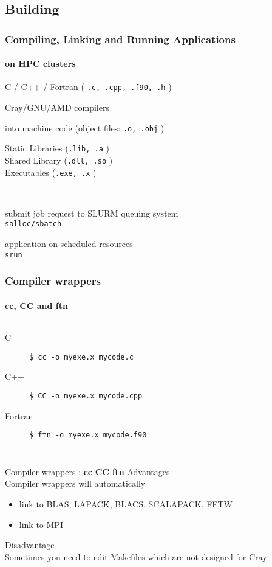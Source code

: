 \subsection{Building}
\begin{frame}[fragile]
\frametitle{Compiling, Linking and Running Applications}
\framesubtitle{on HPC clusters}
 \begin{description}
    \item [source code] C / C++ / Fortran ( \verb|.c, .cpp, .f90, .h|  )
    \item [compile] Cray/GNU/AMD compilers
    \item [assemble] into machine code (object files: \verb|.o, .obj| )
    \item [link] Static Libraries (\verb|.lib, .a|  ) \\ Shared Library (\verb|.dll, .so| ) \\ Executables (\verb|.exe, .x| )
    \item ~ 
    \item [request allocation] submit job request to SLURM queuing system \\ \verb|salloc/sbatch|
    \item [run] application on scheduled resources \\ \verb|srun|
 \end{description}
\end{frame}

\begin{frame}[fragile]
\frametitle{Compiler wrappers}
\framesubtitle{cc, CC and ftn}
\begin{columns}[t]
  \begin{description}
      \item [C] \verb|$ cc -o myexe.x mycode.c|
      \item [C++] \verb|$ CC -o myexe.x mycode.cpp|
      \item [Fortran] \verb|$ ftn -o myexe.x mycode.f90|
  \end{description}
\end{columns}
  \begin{exampleblock}{Compiler wrappers : \alert{\textbf{cc} \textbf{CC} \textbf{ftn}}}
    \alert{Advantages}\\
    Compiler wrappers will automatically 
    \begin{itemize}
      \item link to BLAS, LAPACK, BLACS, SCALAPACK, FFTW\\
      \item link to MPI\\
    \end{itemize}
    \alert{Disadvantage}\\
    Sometimes you need to edit Makefiles which are not designed for Cray 
\end{exampleblock}
\end{frame}
